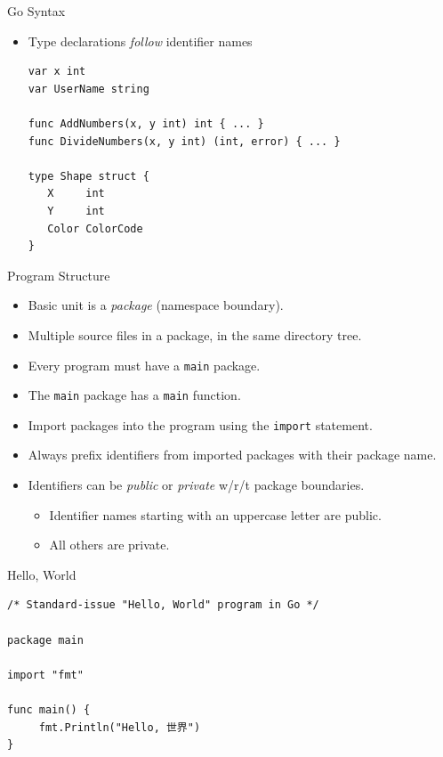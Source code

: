 \documentclass[pdf]{beamer}
\newcommand\z[1]{\texttt{#1}}
\newcommand\identifier[1]{{\color{green!70!black}\z{#1}}}
\newcommand\keyword[1]{{\color{blue}\z{#1}}}
\begin{document}
\begin{frame}[fragile]{Go Syntax}
	\begin{itemize}
		\item Type declarations \emph{follow} identifier names
\begin{lstlisting}
var x int
var UserName string

func AddNumbers(x, y int) int { ... }
func DivideNumbers(x, y int) (int, error) { ... }

type Shape struct {
   X     int
   Y     int
   Color ColorCode
}
\end{lstlisting}
	\end{itemize}
\end{frame}
\begin{frame}{Program Structure}
	\begin{itemize}
		\item Basic unit is a \emph{package} (namespace boundary).\pause
		\item Multiple source files in a package, in the same directory tree.\pause
		\item Every program must have a \identifier{main} package.
		\item The \identifier{main} package has a \identifier{main} function.\pause
		\item Import packages into the program using the \keyword{import} statement.
		\item Always prefix identifiers from imported packages with their package name.\pause
		\item Identifiers can be \emph{public} or \emph{private} w/r/t package boundaries.\pause
			\begin{itemize}
				\item Identifier names starting with an uppercase letter are public.
				\item All others are private.
			\end{itemize}
	\end{itemize}
\end{frame}

\begin{frame}[fragile]{Hello, World}
\begin{lstlisting}
/* Standard-issue "Hello, World" program in Go */

package main

import "fmt"

func main() {
     fmt.Println("Hello, 世界")
}
\end{lstlisting}
\end{frame}
\end{document}
